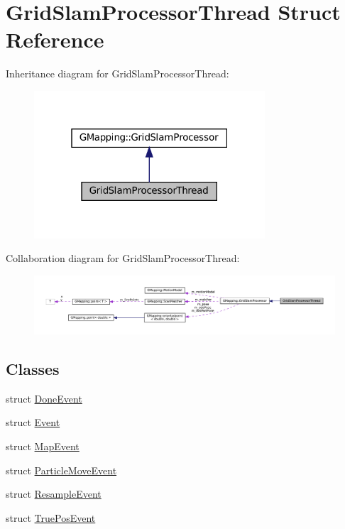 \hypertarget{structGridSlamProcessorThread}{}\section{Grid\+Slam\+Processor\+Thread Struct Reference}
\label{structGridSlamProcessorThread}


Inheritance diagram for Grid\+Slam\+Processor\+Thread\+:
\nopagebreak
\begin{figure}[H]
\begin{center}
\leavevmode
\includegraphics[width=244pt]{structGridSlamProcessorThread__inherit__graph}
\end{center}
\end{figure}


Collaboration diagram for Grid\+Slam\+Processor\+Thread\+:
\nopagebreak
\begin{figure}[H]
\begin{center}
\leavevmode
\includegraphics[width=350pt]{structGridSlamProcessorThread__coll__graph}
\end{center}
\end{figure}
\subsection*{Classes}
\begin{DoxyCompactItemize}
\item 
struct \hyperlink{structGridSlamProcessorThread_1_1DoneEvent}{Done\+Event}
\item 
struct \hyperlink{structGridSlamProcessorThread_1_1Event}{Event}
\item 
struct \hyperlink{structGridSlamProcessorThread_1_1MapEvent}{Map\+Event}
\item 
struct \hyperlink{structGridSlamProcessorThread_1_1ParticleMoveEvent}{Particle\+Move\+Event}
\item 
struct \hyperlink{structGridSlamProcessorThread_1_1ResampleEvent}{Resample\+Event}
\item 
struct \hyperlink{structGridSlamProcessorThread_1_1TruePosEvent}{True\+Pos\+Event}
\end{DoxyCompactItemize}
